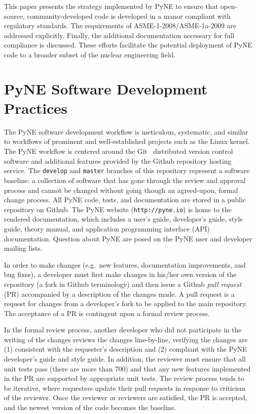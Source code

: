 \documentclass{anstrans}
\begin{document}
This paper presents the strategy implemented by PyNE to ensure that
open-source, community-developed code is developed in a manor compliant with
regulatory standards. The requirements of ASME-1-2008/ASME-1a-2009 are
addressed explicitly. Finally, the additional documentation necessary for full
compliance is discussed. These efforts facilitate the potential deployment of
PyNE code to a broader subset of the nuclear engineering field.


\section{PyNE Software Development Practices}

The PyNE software development workflow is meticulous, systematic, and similar
to workflows of prominent and well-established projects such as the Linux kernel.
The PyNE workflow is centered around the Git~\cite{git_2014} distributed version control software
and additional features provided by the Github repository hosting service.
The \texttt{develop} and \texttt{master} branches of this repository represent
a software baseline: a collection of software that has gone through the review and
approval process and cannot be changed without going though an agreed-upon, formal change process.
All PyNE code, tests, and documentation are stored in a public
repository on Github. The PyNE website (\texttt{http://pyne.io}) is home to the
rendered documentation, which includes a user's guide, developer's guide, style
guide, theory manual, and application programming interface (API) documentation.
Question about PyNE are posed on the PyNE user and developer mailing lists.

In order to make changes (e.g.\ new features, documentation improvements, and
bug fixes), a developer must first make changes in his/her own version of the
repository (a fork in Github terminology) and then issue a Github \emph{pull
request} (PR) accompanied by a description of the changes made. A pull request
is a request for changes from a developer's fork to be applied to the main
repository. The acceptance of a PR is contingent upon a formal review process.

In the formal review process, another developer who did not participate in the writing of the changes
reviews the changes line-by-line, verifying the changes are (1) consistent with
the requester's description and (2) compliant with the PyNE
developer's guide and style guide. In addition, the reviewer must
ensure that all unit tests pass (there are more than 700) and that
any new features implemented in the PR are supported by appropriate unit
tests. The review process tends to be iterative, where requesters update their pull
requests in response to criticism of the reviewer. Once the reviewer or
reviewers are satisfied, the PR is accepted, and the newest version of the
code becomes the baseline.
\end{document}

